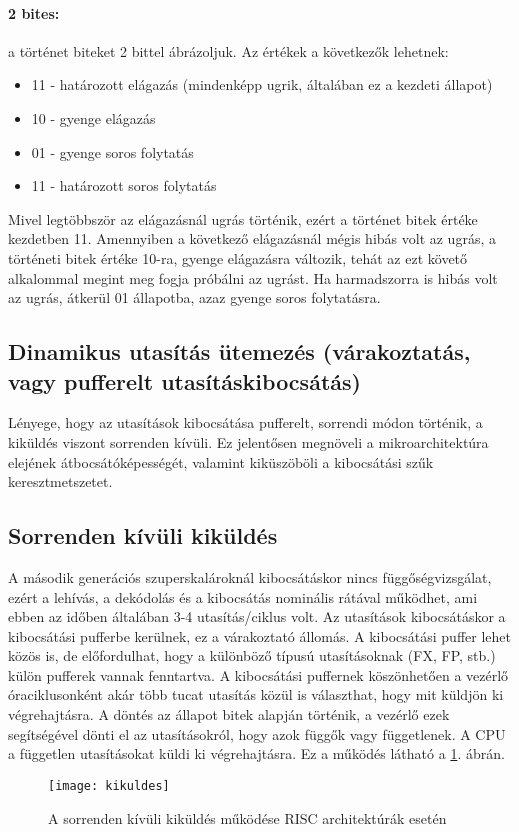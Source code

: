 \paragraph{2 bites:} a történet biteket 2 bittel ábrázoljuk. Az értékek a következők lehetnek:
\begin{itemize}
    \item 11 - határozott elágazás (mindenképp ugrik, általában ez a kezdeti állapot)
    \item 10 - gyenge elágazás
    \item 01 - gyenge soros folytatás
    \item 11 - határozott soros folytatás
\end{itemize}
Mivel legtöbbször az elágazásnál ugrás történik, ezért a történet bitek értéke kezdetben 11.
Amennyiben a következő elágazásnál mégis hibás volt az ugrás, a történeti bitek értéke 10-ra, gyenge elágazásra változik, tehát az ezt követő alkalommal megint meg fogja próbálni az ugrást.
Ha harmadszorra is hibás volt az ugrás, átkerül 01 állapotba, azaz gyenge soros folytatásra.

\subsection{Dinamikus utasítás ütemezés (várakoztatás, vagy pufferelt utasításkibocsátás)}
Lényege, hogy az utasítások kibocsátása pufferelt, sorrendi módon történik, a kiküldés viszont sorrenden kívüli.
Ez jelentősen megnöveli a mikroarchitektúra elejének átbocsátóképességét, valamint kiküszöböli a kibocsátási szűk keresztmetszetet.

\subsection{Sorrenden kívüli kiküldés}
A második generációs szuperskalároknál kibocsátáskor nincs függőségvizsgálat, ezért a lehívás, a dekódolás és a kibocsátás nominális rátával működhet, ami ebben az időben általában 3-4 utasítás/ciklus volt.
Az utasítások kibocsátáskor a kibocsátási pufferbe kerülnek, ez a várakoztató állomás.
A kibocsátási puffer lehet közös is, de előfordulhat, hogy a különböző típusú utasításoknak (FX, FP, stb.) külön pufferek vannak fenntartva.
A kibocsátási puffernek köszönhetően a vezérlő óraciklusonként akár több tucat utasítás közül is választhat, hogy mit küldjön ki végrehajtásra.
A döntés az állapot bitek alapján történik, a vezérlő ezek segítségével dönti el az utasításokról, hogy azok függők vagy függetlenek.
A CPU a független utasításokat küldi ki végrehajtásra.
Ez a működés látható a \ref{fig:kikuldes}. ábrán.
\begin{figure}[h]
    \texttt{[image: kikuldes]}
    \centering
    \caption{A sorrenden kívüli kiküldés működése RISC architektúrák esetén}
    \label{fig:kikuldes}
\end{figure}

